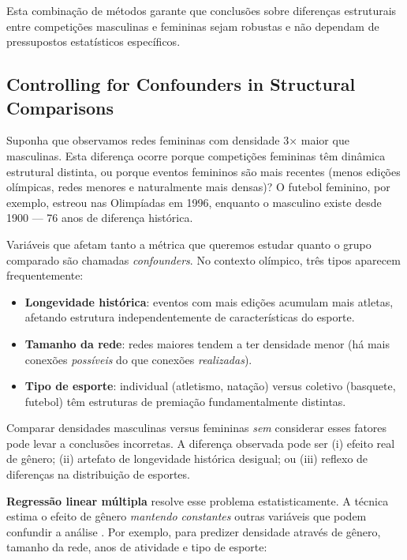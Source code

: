 Esta combinação de métodos garante que conclusões sobre diferenças estruturais entre competições masculinas e femininas sejam robustas e não dependam de pressupostos estatísticos específicos.

\subsection{Controlling for Confounders in Structural Comparisons}

Suponha que observamos redes femininas com densidade 3× maior que masculinas. Esta diferença ocorre porque competições femininas têm dinâmica estrutural distinta, ou porque eventos femininos são mais recentes (menos edições olímpicas, redes menores e naturalmente mais densas)? O futebol feminino, por exemplo, estreou nas Olimpíadas em 1996, enquanto o masculino existe desde 1900 --- 76 anos de diferença histórica.

Variáveis que afetam tanto a métrica que queremos estudar quanto o grupo comparado são chamadas \textit{confounders}. No contexto olímpico, três tipos aparecem frequentemente:

\begin{itemize}
    \item \textbf{Longevidade histórica}: eventos com mais edições acumulam mais atletas, afetando estrutura independentemente de características do esporte.
    \item \textbf{Tamanho da rede}: redes maiores tendem a ter densidade menor (há mais conexões \textit{possíveis} do que conexões \textit{realizadas}).
    \item \textbf{Tipo de esporte}: individual (atletismo, natação) versus coletivo (basquete, futebol) têm estruturas de premiação fundamentalmente distintas.
\end{itemize}

Comparar densidades masculinas versus femininas \textit{sem} considerar esses fatores pode levar a conclusões incorretas. A diferença observada pode ser (i) efeito real de gênero; (ii) artefato de longevidade histórica desigual; ou (iii) reflexo de diferenças na distribuição de esportes.

\textbf{Regressão linear múltipla} resolve esse problema estatisticamente. A técnica estima o efeito de gênero \textit{mantendo constantes} outras variáveis que podem confundir a análise \cite{Montgomery2021Regression}. Por exemplo, para predizer densidade através de gênero, tamanho da rede, anos de atividade e tipo de esporte:

